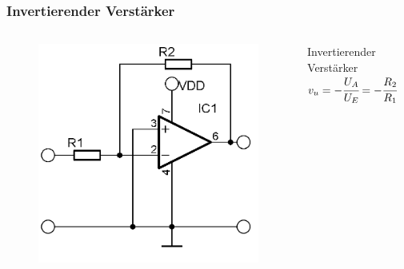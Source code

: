 \begin{frame}
  \frametitle{Invertierender Verstärker}
  \begin{columns}
    \begin{center}
      \begin{figure}
        \includegraphics[width=\textwidth,height=.85\textheight,keepaspectratio]{a06/OPV-Inverter.png}
      \end{figure}
    \end{center}
    \centering
    \begin{block}{Invertierender Verstärker}
      $v_u = -\cfrac{U_A}{U_E} = -\cfrac{R_2}{R_1}$
    \end{block}
  \end{columns}
\end{frame}

